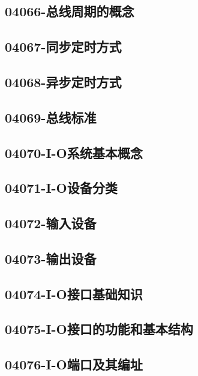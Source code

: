 \subsection{04066-总线周期的概念}

\subsection{04067-同步定时方式}

\subsection{04068-异步定时方式}

\subsection{04069-总线标准}

\subsection{04070-I-O系统基本概念}

\subsection{04071-I-O设备分类}

\subsection{04072-输入设备}

\subsection{04073-输出设备}

\subsection{04074-I-O接口基础知识}

\subsection{04075-I-O接口的功能和基本结构}

\subsection{04076-I-O端口及其编址}

